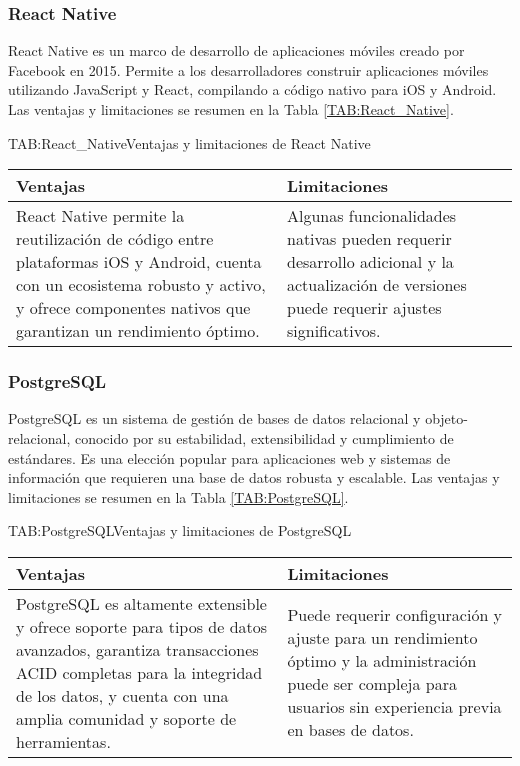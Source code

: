 \subsubsection{React Native}

React Native es un marco de desarrollo de aplicaciones móviles creado por Facebook en 2015. Permite a los desarrolladores construir aplicaciones móviles utilizando JavaScript y React, compilando a código nativo para iOS y Android. Las ventajas y limitaciones se resumen en la Tabla \ref{TAB:React_Native}.

\begin{table}[React Native]{TAB:React_Native}{Ventajas y limitaciones de React Native}
  \begin{tabular}{|p{7cm}|p{7cm}|}
    \hline
    \textbf{Ventajas} & \textbf{Limitaciones} \\
    \hline
    React Native permite la reutilización de código entre plataformas iOS y Android, cuenta con un ecosistema robusto y activo, y ofrece componentes nativos que garantizan un rendimiento óptimo. & Algunas funcionalidades nativas pueden requerir desarrollo adicional y la actualización de versiones puede requerir ajustes significativos. \\
    \hline
  \end{tabular}
\end{table}

\subsubsection{PostgreSQL}

PostgreSQL es un sistema de gestión de bases de datos relacional y objeto-relacional, conocido por su estabilidad, extensibilidad y cumplimiento de estándares. Es una elección popular para aplicaciones web y sistemas de información que requieren una base de datos robusta y escalable. Las ventajas y limitaciones se resumen en la Tabla \ref{TAB:PostgreSQL}.

\begin{table}[PostgreSQL]{TAB:PostgreSQL}{Ventajas y limitaciones de PostgreSQL}
  \begin{tabular}{|p{7cm}|p{7cm}|}
    \hline
    \textbf{Ventajas} & \textbf{Limitaciones} \\
    \hline
    PostgreSQL es altamente extensible y ofrece soporte para tipos de datos avanzados, garantiza transacciones ACID completas para la integridad de los datos, y cuenta con una amplia comunidad y soporte de herramientas. & Puede requerir configuración y ajuste para un rendimiento óptimo y la administración puede ser compleja para usuarios sin experiencia previa en bases de datos. \\
    \hline
  \end{tabular}
\end{table}

